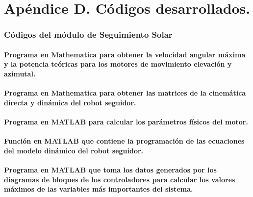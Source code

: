 \chapter{Apéndice D. Códigos desarrollados.}

\subsection{Códigos del módulo de Seguimiento Solar}

\subsubsection{Programa en Mathematica para obtener la velocidad angular máxima y la potencia teóricas para los motores de movimiento elevación y azimutal.}

\UseRawInputEncoding


\subsubsection{Programa en Mathematica para obtener las matrices de la cinemática directa y dinámica del robot seguidor.}

\UseRawInputEncoding


\subsubsection{Programa en MATLAB para calcular los parámetros físicos del motor.}

\UseRawInputEncoding


\subsubsection{Función en MATLAB que contiene la programación de las ecuaciones del modelo dinámico del robot seguidor.}

\UseRawInputEncoding


\subsubsection{Programa en MATLAB que toma los datos generados por los diagramas de bloques de los controladores para calcular los valores máximos de las variables más importantes del sistema.}

